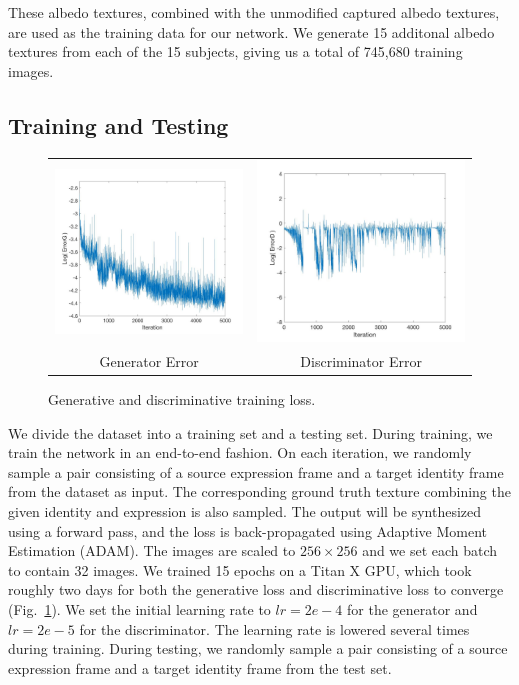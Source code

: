 These albedo textures, combined with the unmodified captured albedo textures, are used as the training data for our network. We generate 15 additonal albedo textures from each of the 15 subjects, giving us a total of 745,680 training images.

\subsection{Training and Testing}

\begin{figure}[h!]
\setlength\tabcolsep{1.5pt}
\centering
\begin{tabular}{cc}

\includegraphics[width=.22\textwidth]{figures/loss/ErrorG2.jpg}&
\includegraphics[width=.22\textwidth]{figures/loss/ErrorD2.jpg} \\
Generator Error & Discriminator Error \\ 
\end{tabular}
\caption{Generative and discriminative training loss.}\label{fig:error}
\vspace{-0.05in}
\end{figure} 



We divide the dataset into a training set and a testing set. During training, we train the network in an end-to-end fashion. On each iteration, we randomly sample a pair consisting of a source expression frame and a target identity frame from the dataset as input. The corresponding ground truth texture combining the given identity and expression is also sampled. The output will be synthesized using a forward pass, and the loss is back-propagated using Adaptive Moment Estimation (ADAM). The images are scaled to $256 \times 256$ and we set each batch to contain 32 images. We trained 15 epochs on a Titan X GPU, which took roughly two days for both the generative loss and discriminative loss to converge (Fig.~\ref{fig:error}). We set the initial learning rate to $lr=2e-4$ for the generator and $lr=2e-5$ for the discriminator. The learning rate is lowered several times during training. During testing, we randomly sample a pair consisting of a source expression frame and a target identity frame from the test set.
